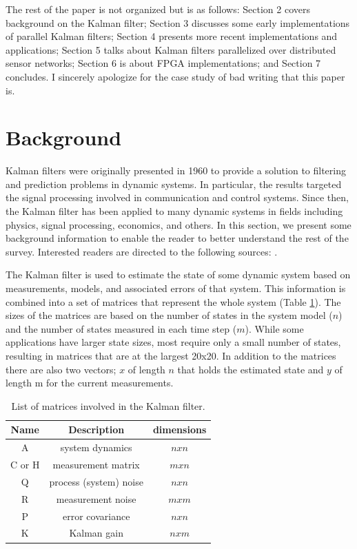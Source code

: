 \documentclass[11pt]{article}
\begin{document}
The rest of the paper is not organized but is as follows: Section 2 covers background on the Kalman filter; Section 3 discusses some early implementations of parallel Kalman filters; Section 4 presents more recent implementations and applications; Section 5 talks about Kalman filters parallelized over distributed sensor networks; Section 6 is about FPGA implementations; and Section 7 concludes. I sincerely apologize for the case study of bad writing that this paper is.


\section{Background}
Kalman filters \cite{kalman1960new} were originally presented in 1960 to provide a solution to filtering and prediction problems in dynamic systems. In particular, the results targeted the signal processing involved in communication and control systems. Since then, the Kalman filter has been applied to many dynamic systems in fields including physics, signal processing, economics, and others. In this section, we present some background information to enable the reader to better understand the rest of the survey. Interested readers are directed to the following sources: \cite{blackman1986multiple, welch1995introduction, budhiraja2007survey, kalman1960new}.

The Kalman filter is used to estimate the state of some dynamic system based on measurements, models, and associated errors of that system. This information is combined into a set of matrices that represent the whole system (Table \ref{mats}). The sizes of the matrices are based on the number of states in the system model ($n$) and the number of states measured in each time step ($m$). While some applications have larger state sizes, most require only a small number of states, resulting in matrices that are at the largest 20x20. In addition to the matrices there are also two vectors; $x$ of length $n$ that holds the estimated state and $y$ of length m for the current measurements.

\begin{table}
\caption{List of matrices involved in the Kalman filter.} 
\label{mats}
\centering
\begin{tabular}{||c c c||} 
\hline
Name & Description & dimensions \\ [0.5ex] 
\hline\hline
A & system dynamics & $nxn$\\
\hline
C or H & measurement matrix & $mxn$\\
\hline
Q & process (system) noise & $nxn$\\
\hline
R & measurement noise & $mxm$\\
\hline
P & error covariance & $nxn$\\
\hline
K & Kalman gain & $nxm$\\
\hline
\end{tabular}
\end{table}
\end{document}
